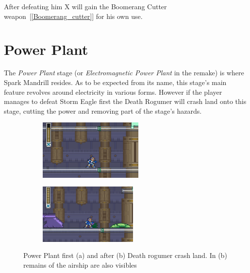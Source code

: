 After defeating him X will gain the Boomerang Cutter weapon~[\ref{Boomerang_cutter}] for his own use.

\section{Power Plant}
The \textit{Power Plant} stage (or \textit{Electromagnetic Power Plant} in the remake) is where Spark Mandrill resides. As to be expected from its name, this stage's main feature revolves around electricity in various forms. However if the player manages to defeat Storm Eagle first the Death Rogumer will crash land onto this stage, cutting the power and removing part of the stage's hazards.
\begin{figure}[htp]
	\centering
	\begin{subfigure}{0.45\linewidth}
		\centering
		\includegraphics[height=3cm]{figures/X1/Spark_mandrill/Mandrill_power.jpg}
		\caption{}
	\end{subfigure}
	\begin{subfigure}{0.45\linewidth}
		\centering
		\includegraphics[height=3cm]{figures/X1/Spark_mandrill/Mandrill_no_power.jpg}
		\caption{}
	\end{subfigure}
	\caption{Power Plant first (a) and after (b) Death rogumer crash land. In (b) remains of the airship are also visibles}
\end{figure}


